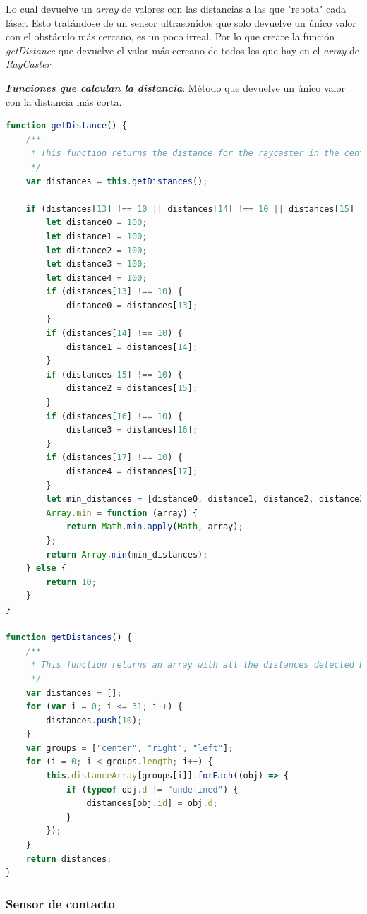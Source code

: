 Lo cual devuelve un \textit{array} de valores con las distancias a las que "rebota" cada láser. Esto tratándose de un sensor ultrasonidos que solo devuelve un único valor con el obstáculo más cercano, es un poco irreal. Por lo que creare la función \textit{getDistance} que devuelve el valor más cercano de todos los que hay en el \textit{array} de \textit{RayCaster} 

\textit{\textbf{Funciones que calculan la distancia}}: Método que devuelve  un único valor con la distancia más corta. 

 \begin{lstlisting}[language=javascript]
function getDistance() {
    /**
     * This function returns the distance for the raycaster in the center of the arc of rays.
     */
    var distances = this.getDistances();

    if (distances[13] !== 10 || distances[14] !== 10 || distances[15] !== 10 || distances[16] !== 10 || distances[17] !== 10) {
        let distance0 = 100;
        let distance1 = 100;
        let distance2 = 100;
        let distance3 = 100;
        let distance4 = 100;
        if (distances[13] !== 10) {
            distance0 = distances[13];
        }
        if (distances[14] !== 10) {
            distance1 = distances[14];
        }
        if (distances[15] !== 10) {
            distance2 = distances[15];
        }
        if (distances[16] !== 10) {
            distance3 = distances[16];
        }
        if (distances[17] !== 10) {
            distance4 = distances[17];
        }
        let min_distances = [distance0, distance1, distance2, distance3, distance4];
        Array.min = function (array) {
            return Math.min.apply(Math, array);
        };
        return Array.min(min_distances);
    } else {
        return 10;
    }
}

function getDistances() {
    /**
     * This function returns an array with all the distances detected by the rays.
     */
    var distances = [];
    for (var i = 0; i <= 31; i++) {
        distances.push(10);
    }
    var groups = ["center", "right", "left"];
    for (i = 0; i < groups.length; i++) {
        this.distanceArray[groups[i]].forEach((obj) => {
            if (typeof obj.d != "undefined") {
                distances[obj.id] = obj.d;
            }
        });
    }
    return distances;
}
\end{lstlisting}

\subsubsection{Sensor de contacto}

